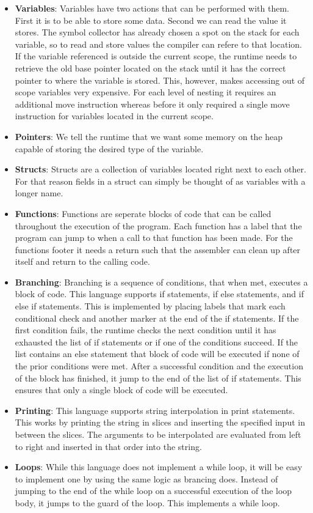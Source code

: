 \begin{itemize}
    \item \textbf{Variables}: Variables have two actions that can be performed with them. First it is to be able to store some data. Second we can read the value it stores. The symbol collector has already chosen a spot on the stack for each variable, so to read and store values the compiler can refere to that location. If the variable referenced is outside the current scope, the runtime needs to retrieve the old base pointer located on the stack until it has the correct pointer to where the variable is stored. This, however, makes accessing out of scope variables very expensive. For each level of nesting it requires an additional move instruction whereas before it only required a single move instruction for variables located in the current scope.
    \item \textbf{Pointers}: We tell the runtime that we want some memory on the heap capable of storing the desired type of the variable. 
    \item \textbf{Structs}: Structs are a collection of variables located right next to each other. For that reason fields in a struct can simply be thought of as variables with a longer name.
    \item \textbf{Functions}: Functions are seperate blocks of code that can be called throughout the execution of the program. Each function has a label that the program can jump to when a call to that function has been made. For the functions footer it needs a return such that the assembler can clean up after itself and return to the calling code.
    \item \textbf{Branching}: Branching is a sequence of conditions, that when met, executes a block of code. This language supports if statements, if else statements, and if else if statements. This is implemented by placing labels that mark each conditional check and another marker at the end of the if statements. If the first condition fails, the runtime checks the next condition until it has exhausted the list of if statements or if one of the conditions succeed. If the list contains an else statement that block of code will be executed if none of the prior conditions were met. After a successful condition and the execution of the block has finished, it jump to the end of the list of if statements. This ensures that only a single block of code will be executed.
    \item \textbf{Printing}: This language supports string interpolation in print statements. This works by printing the string in slices and inserting the specified input in between the slices. The arguments to be interpolated are evaluated from left to right and inserted in that order into the string.
    \item \textbf{Loops}: While this language does not implement a while loop, it will be easy to implement one by using the same logic as brancing does. Instead of jumping to the end of the while loop on a successful execution of the loop body, it jumps to the guard of the loop. This implements a while loop.
\end{itemize}

